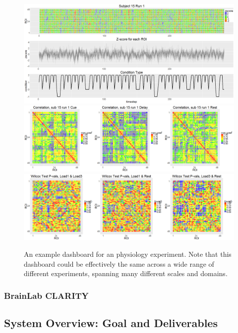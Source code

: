 \begin{figure}%
\includegraphics[width=1\textwidth]{figs/sub-15_run1heat.png}
\includegraphics[width=1\textwidth]{figs/sub-15_run1corr.png}
\includegraphics[width=1\textwidth]{figs/overall_corr_wilcox.png}
\caption{An example dashboard for an physiology experiment.  Note that this dashboard could be effectively the same across a wide range of different experiments, spanning many different scales and domains.
}
\label{f:wilcox}
\end{figure}



\subsubsection{BrainLab CLARITY}


\subsection{System Overview: Goal and Deliverables}

